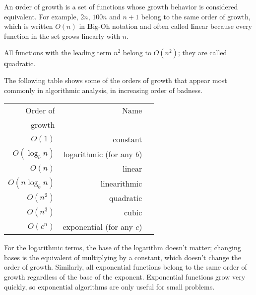 \documentclass[
DIV=11,
fontsize=13,
twoside,
headinclude=false,
titlepage=firstiscover,
abstract=true,
headsepline=true,
footsepline=true,
chapterprefix=true, %
headings=big,
bibliography=totoc,%
captions=tableheading
]{scrbook}
\theoremstyle{definition}
\begin{document}
An {\textbf order of growth} is a set of functions whose growth
behavior is considered equivalent.  For example, $2n$, $100n$ and $n+1$ 
belong to the same order of growth, which is written $O(n)$ in
{\textbf Big-Oh notation} and often called {\textbf linear} because every function
in the set grows linearly with $n$.

All functions with the leading term $n^2$ belong to $O(n^2)$; they are
called {\textbf quadratic}.

The following table shows some of the orders of growth that
appear most commonly in algorithmic analysis,
in increasing order of badness.

\begin{tabular}{|r|r|r|}
\hline
Order of     &   Name      \\
growth       &               \\
\hline
$O(1)$             & constant \\
$O(\log_b n)$      & logarithmic (for any $b$) \\
$O(n)$             & linear \\
$O(n \log_b n)$    & linearithmic \\
$O(n^2)$           & quadratic     \\
$O(n^3)$           & cubic     \\
$O(c^n)$           & exponential (for any $c$)    \\
\hline
\end{tabular}

For the logarithmic terms, the base of the logarithm doesn't matter;
changing bases is the equivalent of multiplying by a constant, which
doesn't change the order of growth.  Similarly, all exponential
functions belong to the same order of growth regardless of the base of
the exponent.
Exponential functions grow very quickly, so exponential algorithms are
only useful for small problems.
\end{document}
